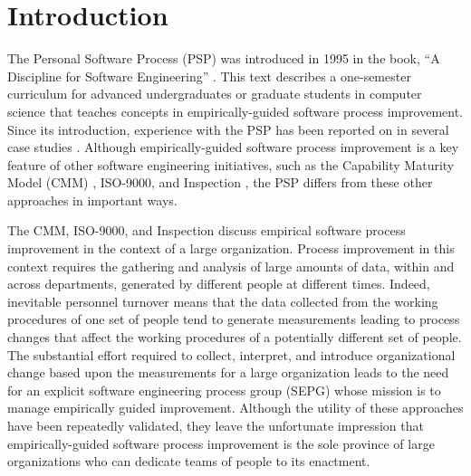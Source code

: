 
\section{Introduction}
\label{sec:introduction}

\begin{quotation}
 \cite{Humphrey95}
\end{quotation}

The Personal Software Process (PSP) was introduced in 1995 in the book, ``A
Discipline for Software Engineering'' \cite{Humphrey95}.  This text
describes a one-semester curriculum for advanced undergraduates or graduate
students in computer science that teaches concepts in empirically-guided
software process improvement. Since its introduction, experience with the
PSP has been reported on in several case studies
\cite{Ceberio-Verghese96,Ferguson97,Humphrey96,Humphrey97}.
Although empirically-guided software process improvement is a key feature
of other software engineering initiatives, such as the Capability Maturity
Model (CMM) \cite{Paulk95}, ISO-9000, and Inspection \cite{Gilb93}, the PSP
differs from these other approaches in important ways.

The CMM, ISO-9000, and Inspection discuss empirical software process
improvement in the context of a large organization.  Process improvement in
this context requires the gathering and analysis of large amounts of data,
within and across departments, generated by different people at different
times.  Indeed, inevitable personnel turnover means that the data collected
from the working procedures of one set of people tend to generate
measurements leading to process changes that affect the working procedures
of a potentially different set of people.  The substantial effort required
to collect, interpret, and introduce organizational change based upon the
measurements for a large organization leads to the need for an explicit
software engineering process group (SEPG) whose mission is to manage
empirically guided improvement. Although the utility of these approaches
have been repeatedly validated, they leave the unfortunate impression that
empirically-guided software process improvement is the sole province of
large organizations who can dedicate teams of people to its enactment.

